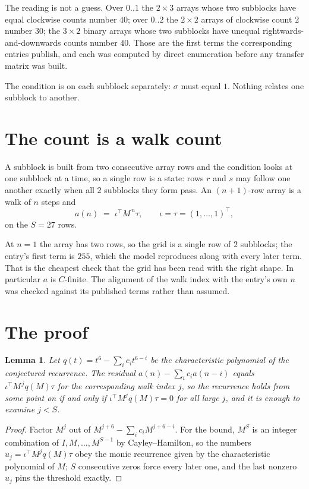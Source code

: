 \documentclass[11pt,a4paper]{article}
\theoremstyle{plain}
\newtheorem{lemma}[theorem]{Lemma}
\theoremstyle{definition}
\begin{document}
The reading is not a guess. Over $0..1$ the $2\times3$ arrays whose two subblocks have equal
clockwise counts number $40$; over $0..2$ the $2\times2$ arrays of clockwise count $2$ number
$30$; the $3\times2$ binary arrays whose two subblocks have unequal rightwards-and-downwards
counts number $40$. Those are the first terms the corresponding entries publish, and each was
computed by direct enumeration before any transfer matrix was built.

The condition is on each subblock separately: $\sigma$ must equal $1$. Nothing
relates one subblock to another.

\section{The count is a walk count}

A subblock is built from two consecutive array rows and the condition looks
at one subblock at a time, so a single row is a state: rows $r$ and $s$ may follow one another
exactly when all $2$ subblocks they form pass. An $(n+1)$-row array is a walk of $n$ steps and
\[
a(n)\;=\;\iota^{\!\top}M^{\,n}\tau,\qquad\iota=\tau=(1,\dots,1)^{\!\top},
\]
on the $S=27$ rows.

At $n=1$ the array has two rows, so the grid is a single row of $2$
subblocks; the entry's first term is $255$, which the model
reproduces along with every later term. That is the cheapest check that the grid has been read
with the right shape.
In particular $a$ is $C$-finite. The alignment of the walk index with the entry's own $n$ was
checked against its published terms rather than assumed.

\section{The proof}

\begin{lemma}\label{lem:crit}
Let $q(t)=t^{6}-\sum_i c_it^{6-i}$ be the characteristic polynomial of the
conjectured recurrence. The residual $a(n)-\sum_ic_ia(n-i)$ equals
$\iota^{\!\top}M^{\,j}q(M)\tau$ for the corresponding walk index $j$, so the recurrence
holds from some point on if and only if $\iota^{\!\top}M^{j}q(M)\tau=0$ for all large $j$,
and it is enough to examine $j<S$.
\end{lemma}

\begin{proof}
Factor $M^{j}$ out of $M^{j+6}-\sum_ic_iM^{j+6-i}$. For the bound, $M^{S}$
is an integer combination of $I,M,\dots,M^{S-1}$ by Cayley--Hamilton, so the numbers
$u_j=\iota^{\!\top}M^{j}q(M)\tau$ obey the monic recurrence given by the characteristic
polynomial of $M$; $S$ consecutive zeros force every later one, and the last nonzero $u_j$
pins the threshold exactly.
\end{proof}
\end{document}
